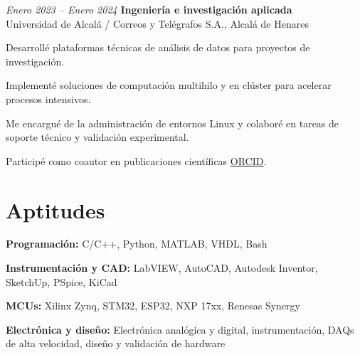 \begin{twocolentry}{\textit{Enero 2023 – Enero 2024}}
	\textbf{Ingeniería e investigación aplicada} \\
	Universidad de Alcalá / Correos y Telégrafos S.A., Alcalá de Henares
\end{twocolentry}
\begin{onecolentry}
	\begin{highlights}
		\item Desarrollé plataformas técnicas de análisis de datos para proyectos de investigación.
		\item Implementé soluciones de computación multihilo y en clúster para acelerar procesos intensivos.
		\item Me encargué de la administración de entornos Linux y colaboré en tareas de soporte técnico y validación experimental.
		\item Participé como coautor en publicaciones científicas \href{https://orcid.org/0009-0000-6862-1872}{ORCID}.
	\end{highlights}
\end{onecolentry}

\vspace{-7pt}

\section{Aptitudes}

\begin{onecolentry}
	\textbf{Programación:} C/C++, Python, MATLAB, VHDL, Bash
\end{onecolentry}
\begin{onecolentry}
	\textbf{Instrumentación y CAD:} LabVIEW, AutoCAD, Autodesk Inventor, SketchUp, PSpice, KiCad
\end{onecolentry}
\begin{onecolentry}
	\textbf{MCUs:} Xilinx Zynq, STM32, ESP32, NXP 17xx, Renesas Synergy
\end{onecolentry}
\begin{onecolentry}
	\textbf{Electrónica y diseño:} Electrónica analógica y digital, instrumentación, DAQs de alta velocidad, diseño y validación de hardware
\end{onecolentry}